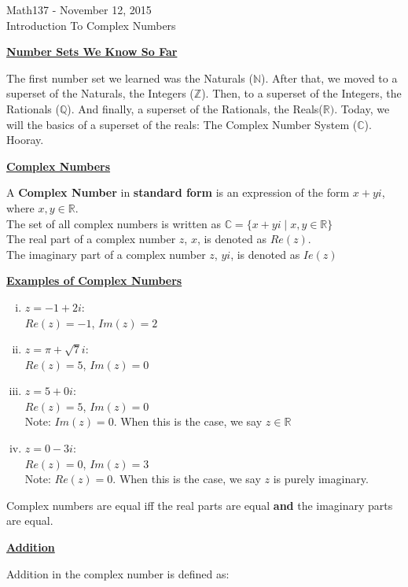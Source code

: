 \documentclass{letter}
\begin{document}
	\begin{center}
		\LARGE Math137 - November 12, 2015\\
		\large Introduction To Complex Numbers
	\end{center}
	\vspace{0.25 in}
	\underline{\textbf{Number Sets We Know So Far}}
	
	The first number set we learned was the Naturals ($\mathbb{N}$). After that, we moved to a superset of the Naturals, the Integers ($\mathbb{Z}$). Then, to a superset of the Integers, the Rationals ($\mathbb{Q}$). And finally, a superset of the Rationals, the Reals($\mathbb{R})$. Today, we will the basics of a superset of the reals: The Complex Number System ($\mathbb{C}$). Hooray.
	
	\underline{\textbf{Complex Numbers}}
	
	A \textbf{Complex Number} in \textbf{standard form} is an expression of the form $x+yi$, where $x, y \in \mathbb{R}$.\\
	The set of all complex numbers is written as $\mathbb{C} = \lbrace x+yi \mid x, y \in \mathbb{R}\rbrace$\\
	The real part of a complex number $z$, $x$, is denoted as $Re(z)$.\\
	The imaginary part of a complex number $z$, $yi$, is denoted as $Ie(z)$
	
	\underline{\textbf{Examples of Complex Numbers}}
	\begin{enumerate}[i)]
		\item $z = -1 + 2i$:\\ $Re(z) = -1$, $Im(z) = 2$
		\item $z = \pi + \sqrt{7}i$:\\ $Re(z) = 5$, $Im(z) = 0$
		\item $z = 5 + 0i$:\\ $Re(z) = 5$, $Im(z) = 0$\\
		Note: $Im(z) = 0$. When this is the case, we say $z \in \mathbb{R}$
		\item $z = 0 - 3i$:\\ $Re(z) = 0$, $Im(z) = 3$\\
		Note: $Re(z) = 0$. When this is the case, we say $z$ is purely imaginary.
	\end{enumerate}
	Complex numbers are equal iff the real parts are equal \textbf{and} the imaginary parts are equal.
	
	\underline{\textbf{Addition}}
	
	Addition in the complex number is defined as:\\
	
\end{document}
